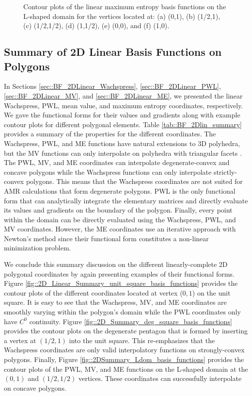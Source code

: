 \begin{figure}
\begin{subfigure}[b]{0.39\textwidth}
		\caption{}
	\end{subfigure}
\caption{Contour plots of the linear maximum entropy basis functions on the L-shaped domain for the vertices located at: (a) (0,1), (b) (1/2,1), (c) (1/2,1/2), (d) (1,1/2), (e) (0,0), and (f) (1,0).}
\label{fig::2D_MAXENT1_Ldom_basis_functions}
\end{figure}



\subsection{Summary of 2D Linear Basis Functions on Polygons}
\label{sec::BF_2DLinear_Summary}

In Sections \ref{sec::BF_2DLinear_Wachspress}, \ref{sec::BF_2DLinear_PWL}, \ref{sec::BF_2DLinear_MV}, and \ref{sec::BF_2DLinear_ME}, we presented the linear Wachspress, PWL, mean value, and maximum entropy coordinates, respectively. We gave the functional forms for their values and gradients along with example contour plots for different polygonal elements. Table \ref{tab::BF_2Dlin_summary} provides a summary of the properties for the different coordinates. The Wachspress, PWL, and ME functions have natural extensions to 3D polyhedra, but the MV functions can only interpolate on polyhedra with triangular facets \cite{floater2005mean,wicke2007finite}. The PWL, MV, and ME coordinates can interpolate degenerate-convex and concave polygons while the Wachspress functions can only interpolate strictly-convex polygons. This means that the Wachspress coordinates are not suited for AMR calculations that form degenerate polygons. PWL is the only functional form that can analytically integrate the elementary matrices and directly evaluate its values and gradients on the boundary of the polygon. Finally, every point within the domain can be directly evaluated using the Wachspress, PWL, and MV coordinates. However, the ME coordinates use an iterative approach with Newton's method since their functional form constitutes a non-linear minimization problem.

We conclude this summary discussion on the different linearly-complete 2D polygonal coordinates by again presenting examples of their functional forms. Figure \ref{fig::2D_Linear_Summary_unit_square_basis_functions} provides the contour plots of the different coordinates located at vertex ($0,1$) on the unit square. It is easy to see that the Wachspress, MV, and ME coordinates are smoothly varying within the polygon's domain while the PWL coordinates only have $C^0$ continuity. Figure \ref{fig::2D_Summary_deg_square_basis_functions} provides the contour plots on the degenerate pentagon that is formed by inserting a vertex at $(1/2,1)$ into the unit square. This re-emphasizes that the Wachspress coordinates are only valid interpolatory functions on strongly-convex polygons. Finally, Figure \ref{fig::2DSummary_Ldom_basis_functions} provides the contour plots of the PWL, MV, and ME functions on the L-shaped domain at the $(0,1)$ and $(1/2,1/2)$ vertices. These coordinates can successfully interpolate on concave polygons.

